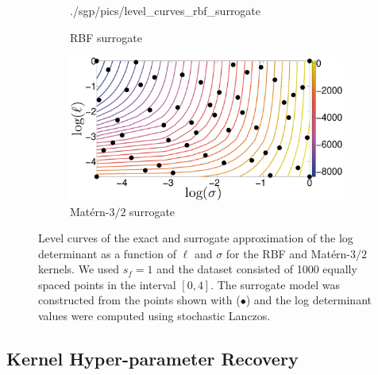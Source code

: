 \begin{figure}[ht]
\begin{center}
\begin{subfigure}{0.46\textwidth}
      {./sgp/pics/level_curves_rbf_surrogate}
      \caption{RBF surrogate}
      \label{fig:level_rbf_surrogate}
    \end{subfigure}
    \begin{subfigure}{0.46\textwidth}
      \centering
      \includegraphics[width=\textwidth,trim=2.5cm 0cm 0.5cm 1.5cm,clip]
      {./sgp/pics/level_curves_Matern3_2_surrogate}
      \caption{Mat\'ern\hyp{}$3/2$ surrogate}
      \label{fig:level_Matern3_2_surrogate}
    \end{subfigure}
    \caption{Level curves of the exact and surrogate approximation of the log
    determinant as a function of $\ell$ and $\sigma$ for the RBF and 
    Mat\'ern\hyp{}$3/2$ kernels. We used $s_f=1$ and the dataset consisted of
    1000 equally spaced points in the interval $[0,4]$. The surrogate model was
    constructed from the points shown with ($\bullet$) and the log determinant
    values were computed using stochastic Lanczos.}\label{fig:level_curves}
  \end{center}
\end{figure}

\subsection{Kernel Hyper-parameter Recovery}\label{sup:hyperrecov}

